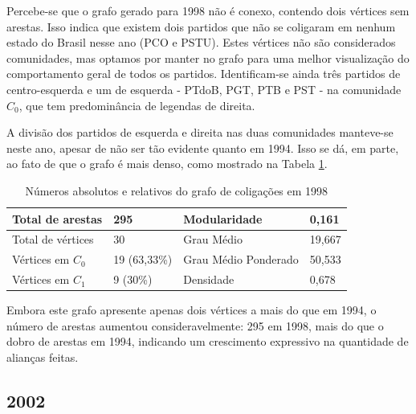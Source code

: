 Percebe-se que o grafo gerado para 1998 não é conexo, contendo dois vértices sem arestas. Isso indica que existem dois partidos que não se coligaram em nenhum estado do Brasil nesse ano (\gls{PCO} e \gls{PSTU}). Estes vértices não são considerados comunidades, mas optamos por manter no grafo para uma melhor visualização do comportamento geral de todos os partidos. Identificam-se ainda três partidos de centro-esquerda e um de esquerda - \gls{PTdoB}, \gls{PGT}, \gls{PTB} e \gls{PST} - na comunidade $C_0$, que tem predominância de legendas de direita.

A divisão dos partidos de esquerda e direita nas duas comunidades manteve-se neste ano, apesar de não ser tão evidente quanto em 1994. Isso se dá, em parte, ao fato de que o grafo é mais denso, como mostrado na Tabela \ref{table-1998}. 



\begin{table}[H]
\centering
\begin{tabular}{|l|l|l|l|}
\hline
Total de arestas  & 295 & Modularidade         & 0,161 \\ \hline
Total de vértices & 30  & Grau Médio           & 19,667 \\ \hline
Vértices em $C_0$    & 19  (63,33\%) & Grau Médio Ponderado & 50,533 \\ \hline
Vértices em $C_1$    & 9 (30\%) & Densidade            &  0,678\\ \hline
\end{tabular}
\caption{Números absolutos e relativos do grafo de coligações em 1998}
\label{table-1998}
\end{table}

Embora este grafo apresente apenas dois vértices a mais do que em 1994, o número de arestas aumentou consideravelmente: 295 em 1998, mais do que o dobro de arestas em 1994, indicando um crescimento expressivo na quantidade de alianças feitas.


\subsection{2002}
\label{resultados__grafos--2002}

